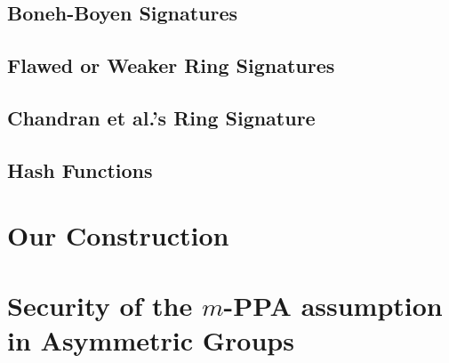 \documentclass[a4paper,english]{lipics-v2016}
\begin{document}
        \subsection{Boneh-Boyen Signatures} \label{sec:bbs}
    
            

    \subsection{Flawed or Weaker Ring Signatures}\label{sec:rs-flawed}
    
         

       \subsection{Chandran et al.'s Ring Signature}
	
         

	\subsection{Hash Functions} \label{sec:hash}

	

    \section{Our Construction}

	
        
    	
        





\appendix

	\section{Security of the $m$-PPA assumption in Asymmetric Groups} \label{sec:aPPA}
	
\end{document}
